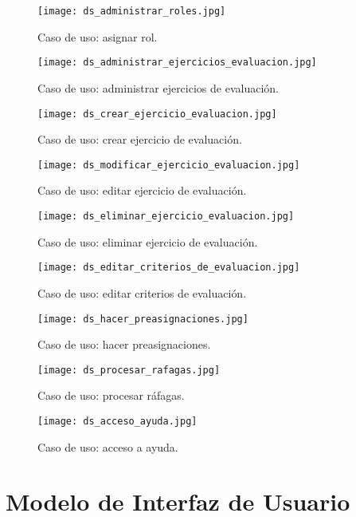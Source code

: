 \begin{figure}
	\centering
	\texttt{[image: ds\_administrar\_roles.jpg]}
	\caption{Caso de uso: asignar rol.}
\end{figure}

\begin{figure}
	\centering
	\texttt{[image: ds\_administrar\_ejercicios\_evaluacion.jpg]}
	\caption{Caso de uso: administrar ejercicios de evaluación.}
\end{figure}

\begin{figure}
	\centering
	\texttt{[image: ds\_crear\_ejercicio\_evaluacion.jpg]}
	\caption{Caso de uso: crear ejercicio de evaluación.}
\end{figure}

\begin{figure}
	\centering
	\texttt{[image: ds\_modificar\_ejercicio\_evaluacion.jpg]}
	\caption{Caso de uso: editar ejercicio de evaluación.}
\end{figure}

\begin{figure}
	\centering
	\texttt{[image: ds\_eliminar\_ejercicio\_evaluacion.jpg]}
	\caption{Caso de uso: eliminar ejercicio de evaluación.}
\end{figure}

\begin{figure}
	\centering
	\texttt{[image: ds\_editar\_criterios\_de\_evaluacion.jpg]}
	\caption{Caso de uso: editar criterios de evaluación.}
\end{figure}

\begin{figure}
	\centering
	\texttt{[image: ds\_hacer\_preasignaciones.jpg]}
	\caption{Caso de uso: hacer preasignaciones.}
\end{figure}

\begin{figure}
	\centering
	\texttt{[image: ds\_procesar\_rafagas.jpg]}
	\caption{Caso de uso: procesar ráfagas.}
\end{figure}

\begin{figure}
	\centering
	\texttt{[image: ds\_acceso\_ayuda.jpg]}
	\caption{Caso de uso: acceso a ayuda.}
\end{figure}

\newpage

\section{Modelo de Interfaz de Usuario}

